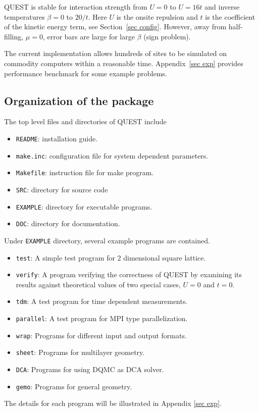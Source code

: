 \documentclass[12pt]{article}
\begin{document}
    QUEST is stable for interaction strength from
    $U=0$ to $U=16t$ and inverse temperatures $\beta=0$ to $20/t$.
    Here $U$ is the onsite repulsion and $t$ is the coefficient of the kinetic energy term,
    see Section~\ref{sec config}.
    However, away from half-filling,
    $\mu=0$, error bars are large for large $\beta$ (sign problem).

    The current implementation allows hundreds of sites to be simulated on commodity computers within a reasonable time. Appendix~\ref{sec exp} provides performance benchmark for some example problems.


\subsection{Organization of the package}
The top level files and directories of QUEST include
\begin{itemize}
  \item \verb"README": installation guide.
  \item \verb"make.inc": configuration file for system dependent parameters.
  \item \verb"Makefile": instruction file for make program.
  \item \verb"SRC": directory for source code
  \item \verb"EXAMPLE": directory for executable programs.
  \item \verb"DOC": directory for documentation.
\end{itemize}

Under \verb"EXAMPLE" directory, several example programs are contained.
\begin{itemize}
  \item \verb"test": A simple test program for 2 dimensional square lattice.
  \item \verb"verify": A program verifying the correctness of QUEST by examining its results against theoretical values of two special cases, $U=0$ and $t=0$.
  \item \verb"tdm": A test program for time dependent measurements.
  \item \verb"parallel": A test program for MPI type parallelization.
  \item \verb"wrap": Programs for different input and output formats.
  \item \verb"sheet": Programs for multilayer geometry.
  \item \verb"DCA": Programs for using DQMC as DCA solver.
  \item \verb"gemo": Programs for general geometry.
\end{itemize}
The details for each program will be illustrated in Appendix \ref{sec exp}.
\end{document}
